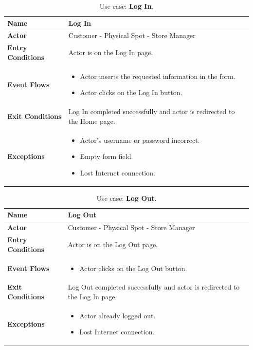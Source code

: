 \begin{table}[H]
\centering
\begin{tabular}{| m{} | m{} |} 
	\hline
	\textbf{Name} & Log In \\ 
	\hline
	\textbf{Actor} & Customer - Physical Spot - Store Manager \\ 
	\hline
	\textbf{Entry Conditions} & Actor is on the Log In page. \\ 
	\hline
	\textbf{Event Flows} &
	\begin{itemize}
	\item Actor inserts the requested information in the form.
	\item Actor clicks on the Log In button.
	\end{itemize} \\ 
	\hline
	\textbf{Exit Conditions} & Log In completed successfully and actor is redirected to the Home page. \\ 
	\hline
	\textbf{Exceptions} &
	\begin{itemize}
	\item Actor's username or password incorrect.
	\item Empty form field.
	\item Lost Internet connection.
	\end{itemize} \\ 
	\hline
\end{tabular}
\caption{Use case: \textbf{Log In}.}
\label{tableLogIn}
\end{table}

\begin{table}[H]
\centering
\begin{tabular}{| m{} | m{} |} 
	\hline
	\textbf{Name} & Log Out \\ 
	\hline
	\textbf{Actor} & Customer - Physical Spot - Store Manager \\ 
	\hline
	\textbf{Entry Conditions} & Actor is on the Log Out page. \\ 
	\hline
	\textbf{Event Flows} &
	\begin{itemize}
	\item Actor clicks on the Log Out button.
	\end{itemize} \\ 
	\hline
	\textbf{Exit Conditions} & Log Out completed successfully and actor is redirected to the Log In page. \\ 
	\hline
	\textbf{Exceptions} &
	\begin{itemize}
	\item Actor already logged out.
	\item Lost Internet connection.
	\end{itemize} \\ 
	\hline
\end{tabular}
\caption{Use case: \textbf{Log Out}.}
\label{tableLogOut}
\end{table}

